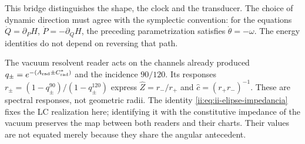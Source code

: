 This bridge distinguishes the shape, the clock and the transducer. The choice of dynamic direction must agree with the symplectic convention: for the equations \(\dot Q=\partial_PH\), \(\dot P=-\partial_QH\), the preceding parametrization satisfies \(\dot\theta=-\omega\). The energy identities do not depend on reversing that path.

The vacuum resolvent reader acts on the channels already produced \(q_\pm=e^{-(A_{\rm rad}\pm C^*_{\rm rad})}\) and the incidence \(90/120\). Its responses \(r_\pm=(1-q_\pm^{90})/(1-q_\pm^{120})\) express \(\widehat Z=r_-/r_+\) and \(\widehat c=(r_+r_-)^{-1}\). These are spectral responses, not geometric radii. The identity \eqref{ii:eq:ii-elipse-impedancia} fixes the LC realization here; identifying it with the constitutive impedance of the vacuum preserves the map between both readers and their charts. Their values are not equated merely because they share the angular antecedent.

